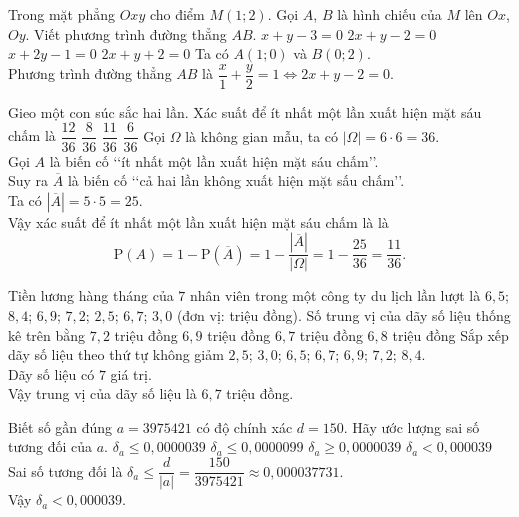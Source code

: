 \begin{ex}%
Trong mặt phẳng $Oxy$ cho điểm $M(1;2)$. Gọi $A$, $B$ là hình chiếu của $M$ lên $Ox$, $Oy$. Viết phương trình đường thẳng $AB$.
\choice
{$x+y-3=0$}
{\True $2x+y-2=0$}
{$x+2y-1=0$}
{$2x+y+2=0$}
\loigiai
{
Ta có $A(1;0)$ và $B(0;2)$. \\
Phương trình đường thẳng $AB$ là $\dfrac{x}{1}+\dfrac{y}{2}=1 \Leftrightarrow 2x+y-2=0$.
}
\end{ex}

\begin{ex}%
Gieo một con súc sắc hai lần. Xác suất để ít nhất một lần xuất hiện mặt sáu chấm là
\choice
{$\dfrac{12}{36}$}
{$\dfrac{8}{36}$}
{\True $\dfrac{11}{36}$}
{$\dfrac{6}{36}$}
\loigiai
{
Gọi $\Omega$ là không gian mẫu, ta có $|\Omega|=6\cdot6=36$. \\
Gọi $A$ là biến cố \lq\lq ít nhất một lần xuất hiện mặt sáu chấm\rq\rq. \\
Suy ra $\overline{A}$ là biến cố \lq\lq cả hai lần không xuất hiện mặt sấu chấm\rq\rq. \\
Ta có $\left|\overline{A}\right|=5\cdot5=25$. \\
Vậy xác suất để ít nhất một lần xuất hiện mặt sáu chấm là là
$$\mathrm{P}(A)=1-\mathrm{P}\left(\overline{A}\right)=1-\dfrac{\left|\overline{A}\right|}{|\Omega|}=1-\dfrac{25}{36}=\dfrac{11}{36}.$$
}
\end{ex}

\begin{ex}%
Tiền lương hàng tháng của $7$ nhân viên trong một công ty du lịch lần lượt là $6{,}5$; $8{,}4$; $6{,}9$; $7{,}2$; $2{,}5$; $6{,}7$; $3{,}0$ (đơn vị: triệu đồng). Số trung vị của dãy số liệu thống kê trên bằng
\choice
{$7{,}2$ triệu đồng}
{$6{,}9$ triệu đồng}
{\True $6{,}7$ triệu đồng}
{$6{,}8$ triệu đồng}
\loigiai
{
Sắp xếp dãy số liệu theo thứ tự không giảm $2{,}5$; $3{,}0$; $6{,}5$; $6{,}7$; $6{,}9$; $7{,}2$; $8{,}4$. \\
Dãy số liệu có $7$ giá trị. \\
Vậy trung vị của dãy số liệu là $6{,}7$ triệu đồng.
}
\end{ex}

\begin{ex}%
Biết số gần đúng $a=3975421$ có độ chính xác $d=150$. Hãy ước lượng sai số tương đối của $a$.
\choice
{$\delta_a\leqslant0{,}0000039$}
{$\delta_a\leqslant0{,}0000099$}
{$\delta_a\geqslant0{,}0000039$}
{\True $\delta_a<0{,}000039$}
\loigiai
{
Sai số tương đối là $\delta_a\leqslant\dfrac{d}{|a|}=\dfrac{150}{3975421}\approx0{,}000037731$. \\
Vậy $\delta_a<0{,}000039$.
}
\end{ex}

